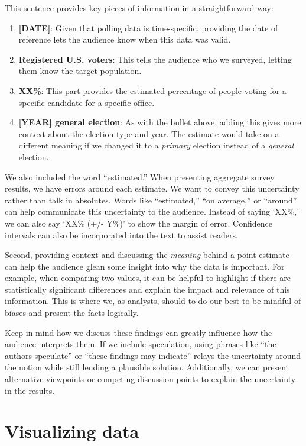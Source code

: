 \documentclass[
]{krantz}
\providecommand{\tightlist}{%
  \setlength{\itemsep}{0pt}\setlength{\parskip}{0pt}}
\begin{document}
This sentence provides key pieces of information in a straightforward way:

\begin{enumerate}
\def\labelenumi{\arabic{enumi}.}
\tightlist
\item
  \textbf{{[}DATE{]}}: Given that polling data is time-specific, providing the date of reference lets the audience know when this data was valid.
\item
  \textbf{Registered U.S. voters}: This tells the audience who we surveyed, letting them know the target population.
\item
  \textbf{XX\%}: This part provides the estimated percentage of people voting for a specific candidate for a specific office.
\item
  \textbf{{[}YEAR{]} general election}: As with the bullet above, adding this gives more context about the election type and year. The estimate would take on a different meaning if we changed it to a \emph{primary} election instead of a \emph{general} election.
\end{enumerate}

We also included the word ``estimated.'' When presenting aggregate survey results, we have errors around each estimate. We want to convey this uncertainty rather than talk in absolutes. Words like ``estimated,'' ``on average,'' or ``around'' can help communicate this uncertainty to the audience. Instead of saying `XX\%,' we can also say `XX\% (+/- Y\%)' to show the margin of error. Confidence intervals can also be incorporated into the text to assist readers.

Second, providing context and discussing the \emph{meaning} behind a point estimate can help the audience glean some insight into why the data is important. For example, when comparing two values, it can be helpful to highlight if there are statistically significant differences and explain the impact and relevance of this information. This is where we, as analysts, should to do our best to be mindful of biases and present the facts logically.

Keep in mind how we discuss these findings can greatly influence how the audience interprets them. If we include speculation, using phrases like ``the authors speculate'' or ``these findings may indicate'' relays the uncertainty around the notion while still lending a plausible solution. Additionally, we can present alternative viewpoints or competing discussion points to explain the uncertainty in the results.

\hypertarget{visualizing-data}{%
\section{Visualizing data}\label{visualizing-data}}
\end{document}
